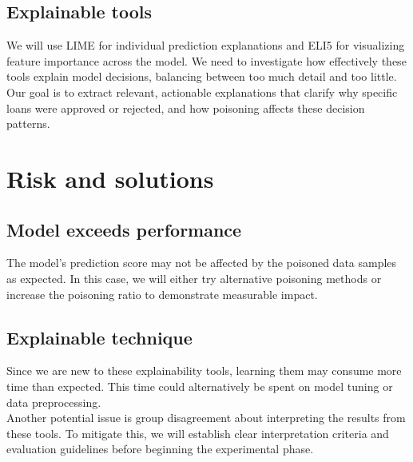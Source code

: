 \documentclass[conference]{IEEEtran}
\begin{document}
\subsection{Explainable tools}
We will use LIME for individual prediction explanations and ELI5 for visualizing feature importance across the model. We need to investigate how effectively these tools explain model decisions, balancing between too much detail and too little. Our goal is to extract relevant, actionable explanations that clarify why specific loans were approved or rejected, and how poisoning affects these decision patterns.


\section{Risk and solutions}
\subsection{Model exceeds performance}
The model's prediction score may not be affected by the poisoned data samples as expected. In this case, we will either try alternative poisoning methods or increase the poisoning ratio to demonstrate measurable impact.
\subsection{Explainable technique}
Since we are new to these explainability tools, learning them may consume more time than expected. This time could alternatively be spent on model tuning or data preprocessing.\\
Another potential issue is group disagreement about interpreting the results from these tools. To mitigate this, we will establish clear interpretation criteria and evaluation guidelines before beginning the experimental phase.
\end{document}
